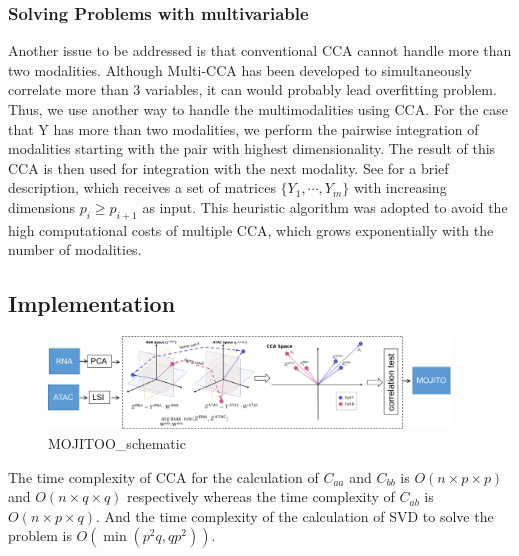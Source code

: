 \subsubsection{Solving Problems with multivariable}
Another issue to be addressed is that conventional CCA cannot handle more than two modalities. Although Multi-CCA has been developed to simultaneously correlate more than 3 variables, it can would probably lead overfitting problem. Thus, we use another way to handle the multimodalities using CCA. For the case that Y has more than two modalities, we perform the pairwise integration of modalities starting with the pair with highest dimensionality. The result of this CCA is then used for integration
with the next modality. See  for a brief description, which receives a set of matrices $\{Y_{1},\cdots, Y_{m}\}$ with increasing dimensions $p_{i}\geq p_{i+1}$ as input. This heuristic algorithm was adopted to avoid the high computational costs of multiple CCA, which grows exponentially with the number of modalities. 

\subsection{Implementation}
\begin{figure}[!ht]
	\centering
	\includegraphics[width=0.95\textwidth]{MOJITOO_schematic/fig}
	\vspace{0.1cm}
	\caption[MOJITOO\_schematic.]{MOJITOO\_schematic}
	\label{fig:MOJITOO_schematic}
\end{figure}

The time complexity of CCA for the calculation of $C_{aa}$ and $C_{bb}$ is $O(n\times p \times p)$ and $O(n\times q \times q)$ respectively whereas the time complexity of $C_{ab}$ is $O(n\times p \times q)$. And the time complexity of the  calculation of SVD to solve the problem is $O(\min(p^2q,qp^2))$.

